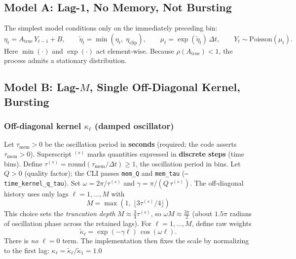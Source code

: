 \documentclass[11pt]{article}
\begin{document}
\subsection{Model A: Lag-1, No Memory, Not Bursting}
\label{sec:lag1}

The simplest model conditions only on the immediately preceding bin:
\begin{equation}
  \eta_t = A_{\text{true}}\,Y_{t-1}+B,
  \qquad
  \tilde{\eta}_t = \min(\eta_t,\;\eta_{\mathrm{clip}}),
  \qquad
  \mu_t = \exp(\tilde{\eta}_t)\,\Delta t,
  \qquad
  Y_t \sim \mathrm{Poisson}(\mu_t).
  \label{eq:lag1}
\end{equation}
Here $\min(\cdot)$ and $\exp(\cdot)$ act element-wise. 
Because $\rho(A_{\text{true}})<1$, the process admits a stationary
distribution.

\subsection{Model B: Lag-$M$, Single Off-Diagonal Kernel, Bursting}
\label{sec:lagM_single}

\subsubsection{Off-diagonal kernel $\kappa_\ell$ (damped oscillator)}


Let $\tau_{\mathrm{mem}}>0$ be the oscillation period in \textbf{seconds}
(required; the code asserts $\tau_{\mathrm{mem}}>0$).
Superscript ${}^{(s)}$ marks quantities expressed in \textbf{discrete steps}
(time bins).
Define $\tau^{(s)}=\mathrm{round}(\tau_{\mathrm{mem}}/\Delta t)\ge 1$, the oscillation period in bins.
Let $Q>0$ (quality factor); the CLI passes \texttt{mem\_Q} and \texttt{mem\_tau}
(\texttt{--time\_kernel\_q\_tau}).
Set $\omega=2\pi/\tau^{(s)}$ and $\gamma=\pi/(Q\,\tau^{(s)})$.
The off-diagonal history uses only lags $\ell=1,\dots,M$ with
\begin{equation}
  M = \max\!\left(1,\;\bigl\lfloor 3\tau^{(s)}/4\bigr\rfloor\right)
\end{equation}
This choice sets the \emph{truncation depth} $M\approx \tfrac{3}{4}\tau^{(s)}$,
so $\omega M\approx \tfrac{3\pi}{2}$ (about $1.5\pi$ radians of oscillation phase
across the retained lags). 
For $\ell=1,\dots,M$, define raw weights
\begin{equation}
  \tilde{\kappa}_\ell = \exp(-\gamma \ell)\,\cos(\omega \ell).
  \label{eq:kappa_offdiag_gen4}
\end{equation}
There is \emph{no} $\ell=0$ term.
The implementation then fixes the scale by normalizing to the first lag:
$\kappa_\ell = \tilde{\kappa}_\ell / \tilde{\kappa}_1=1.0$
\end{document}
